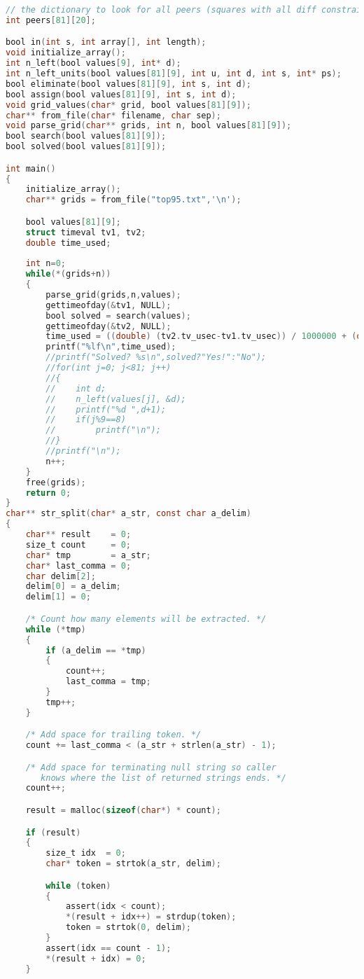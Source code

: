 \documentclass[a4paper, 12pt]{report}
\begin{document}
\begin{appendices}
\begin{lstlisting}[frame=single, language=C]
// the dictionary to look for all peers (squares with all diff constraint) of a square
int peers[81][20];

bool in(int s, int array[], int length);
void initialize_array();
int n_left(bool values[9], int* d);
int n_left_units(bool values[81][9], int u, int d, int s, int* ps);
bool eliminate(bool values[81][9], int s, int d);
bool assign(bool values[81][9], int s, int d);
void grid_values(char* grid, bool values[81][9]);
char** from_file(char* filename, char sep);
void parse_grid(char** grids, int n, bool values[81][9]);
bool search(bool values[81][9]);
bool solved(bool values[81][9]);

int main()
{
    initialize_array();
    char** grids = from_file("top95.txt",'\n');

    bool values[81][9];
    struct timeval tv1, tv2;
    double time_used;
    
    int n=0;
    while(*(grids+n))
    {
        parse_grid(grids,n,values);
        gettimeofday(&tv1, NULL);
        bool solved = search(values);
        gettimeofday(&tv2, NULL);
        time_used = ((double) (tv2.tv_usec-tv1.tv_usec)) / 1000000 + (double) (tv2.tv_sec - tv1.tv_sec);
        printf("%lf\n",time_used);
        //printf("Solved? %s\n",solved?"Yes!":"No");
        //for(int j=0; j<81; j++)
        //{
        //    int d;
        //    n_left(values[j], &d);
        //    printf("%d ",d+1);
        //    if(j%9==8)
        //        printf("\n");
        //}
        //printf("\n");
        n++;
    }
    free(grids);
    return 0;
}
char** str_split(char* a_str, const char a_delim)
{
    char** result    = 0;
    size_t count     = 0;
    char* tmp        = a_str;
    char* last_comma = 0;
    char delim[2];
    delim[0] = a_delim;
    delim[1] = 0;

    /* Count how many elements will be extracted. */
    while (*tmp)
    {
        if (a_delim == *tmp)
        {
            count++;
            last_comma = tmp;
        }
        tmp++;
    }

    /* Add space for trailing token. */
    count += last_comma < (a_str + strlen(a_str) - 1);

    /* Add space for terminating null string so caller
       knows where the list of returned strings ends. */
    count++;

    result = malloc(sizeof(char*) * count);

    if (result)
    {
        size_t idx  = 0;
        char* token = strtok(a_str, delim);

        while (token)
        {
            assert(idx < count);
            *(result + idx++) = strdup(token);
            token = strtok(0, delim);
        }
        assert(idx == count - 1);
        *(result + idx) = 0;
    }


\end{lstlisting}
\end{appendices}
\end{document}
